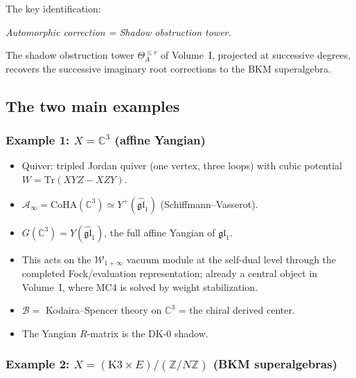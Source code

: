 \documentclass[11pt]{article}
\theoremstyle{definition}
\theoremstyle{remark}
\newcommand{\Tr}{\mathrm{Tr}}
\newcommand{\CoHA}{\mathrm{CoHA}}
\newcommand{\cA}{\mathcal{A}}
\newcommand{\cB}{\mathcal{B}}
\newcommand{\frakgl}{\mathfrak{gl}}
\begin{document}
The key identification:
\begin{center}
\emph{Automorphic correction = Shadow obstruction tower.}
\end{center}
The shadow obstruction tower $\Theta_A^{\leq r}$ of Volume~I, projected at
successive degrees, recovers the successive imaginary root corrections to the
BKM superalgebra.

\subsection{The two main examples}
\label{sec:two-examples}

\subsubsection{Example 1: $X = \mathbb{C}^3$ (affine Yangian)}

\begin{itemize}
 \item Quiver: tripled Jordan quiver (one vertex, three loops) with
 cubic potential $W = \Tr(XYZ - XZY)$.
 \item $\cA_\infty = \CoHA(\mathbb{C}^3) \simeq Y^+(\widehat{\frakgl}_1)$
 (Schiffmann--Vasserot).
 \item $G(\mathbb{C}^3) = Y(\widehat{\frakgl}_1)$, the full affine Yangian
 of $\frakgl_1$.
 \item This acts on the $\mathcal{W}_{1+\infty}$ vacuum module at the self-dual level
 through the completed Fock/evaluation representation; already a central object in Volume~I, where MC4 is solved by weight
 stabilization.
 \item $\cB = $ Kodaira--Spencer theory on $\mathbb{C}^3$ = the chiral
 derived center.
 \item The Yangian $R$-matrix is the DK-0 shadow.
\end{itemize}

\subsubsection{Example 2: $X = (\text{K3} \times E) / (\mathbb{Z}/N\mathbb{Z})$
 (BKM superalgebras)}
\end{document}
